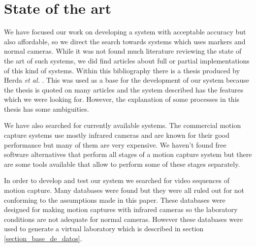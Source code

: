 \section{State of the art}\label{estadoDelArte}

We have focused our work on developing a system with acceptable accuracy but also affordable, so we direct the search towards systems which uses markers and normal cameras. While it was not found much literature reviewing the state of the art of such systems, we did find articles about full or partial implementations of this kind of systems. Within this bibliography there is a thesis produced by Herda \textit{et al.} \cite{herda}. This was used as a base for the development of our system because the thesis is quoted on many articles and the system described has the features which we were looking for. However, the explanation of some processes in this thesis has some ambiguities.

We have also searched for currently available systems. The commercial motion capture systems use mostly infrared cameras and are known for their good performance but many of them are very expensive. We haven't found free software alternatives that perform all stages of a motion capture system but there are some tools available that allow to perform some of these stages separately.

In order to develop and test our system we searched for video sequences of motion capture. Many databases were found but they were all ruled out for not conforming to the assumptions made in this paper. These databases were designed for making motion captures with infrared cameras so the laboratory conditions are not adequate for normal cameras. However these databases were used to generate a virtual laboratory which is described in section \ref{section_base_de_datos}.




